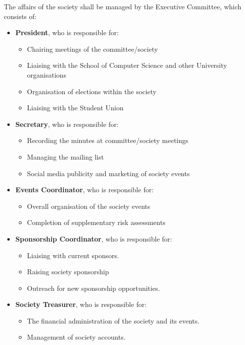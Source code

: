 \documentclass{article}
\begin{document}
The affairs of the society shall be managed by the Executive Committee, which
consists of:
\begin{itemize}
        \item \textbf{President}, who is responsible for:
            \begin{itemize}
                \item Chairing meetings of the committee/society
                \item Liaising with the School of Computer Science and other University organisations
                \item Organisation of elections within the society
                \item Liaising with the Student Union
            \end{itemize}
        \item \textbf{Secretary}, who is responsible for:
            \begin{itemize}
                \item Recording the minutes at committee/society meetings
                \item Managing the mailing list
                \item Social media publicity and marketing of society events
            \end{itemize}
        \item \textbf{Events Coordinator}, who is responsible for:
            \begin{itemize}
                \item Overall organisation of the society events
                \item Completion of supplementary risk assessments
            \end{itemize}
        \item \textbf{Sponsorship Coordinator}, who is responsible for:
            \begin{itemize}
                \item Liaising with current sponsors.
                \item Raising society sponsorship
                \item Outreach for new sponsorship opportunities.
            \end{itemize}
        \item \textbf{Society Treasurer}, who is responsible for:
            \begin{itemize}
                \item The financial administration of the society and its events.
                \item Management of society accounts.
            \end{itemize}
\end{itemize}
\end{document}
